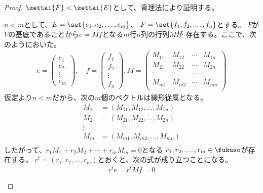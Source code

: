 	\begin{proof} %
		$\zettai{F}<\zettai{E}$として、背理法により証明する。
		\begin{description}\setlength{\itemsep}{-1mm} %
			\item[有限次元の場合] $n<m$として、$E=\set{e_1,e_2,\dots,e_m}$、
			$F=\set{f_1,f_2,\dots,f_n}$とする。
			$F$が$V$の基底であることから$e=Mf$となる$m$行$n$列の行列$M$が
			存在する。ここで、次のようにおいた。
			\begin{equation*}\begin{split} %
				e = \begin{pmatrix}
				e_1 \\ e_2 \\ \vdots \\ e_m
				\end{pmatrix},\quad f = \begin{pmatrix}
				f_1 \\ f_2 \\ \vdots \\ f_n
				\end{pmatrix},M = \begin{pmatrix}
				M_{11} & M_{12} & \cdots & M_{1n} \\
				M_{21} & M_{22} & \cdots & M_{2n} \\
				\vdots & \vdots & \cdots & \vdots \\
				M_{m1} & M_{m2} & \cdots & M_{mn} \\
				\end{pmatrix}
			\end{split}\end{equation*} %
			仮定より$n<m$だから、次の$m$個のベクトルは線形従属となる。
			\begin{equation*}\begin{split} %
				M_1 &= (M_{11}, M_{12}, \dots, M_{1n}) \\
				M_2 &= (M_{21}, M_{22}, \dots, M_{2n}) \\
				\vdots \\
				M_m &= (M_{m1}, M_{m2}, \dots, M_{mn}) \\
			\end{split}\end{equation*} %
			したがって、$r_1M_1+r_2M_2+\cdots+r_mM_m=0$となる
			$r_1,r_2,\dots,r_m\in\fukuso$が存在する。
			$r^t=(r_1,r_2,\dots,r_m)$とおくと、次の式が成り立つことになる。
			\begin{equation*}\begin{split} %
				r^te = r^tMf = 0
			\end{split}\end{equation*} %

\end{description}
\end{proof}
